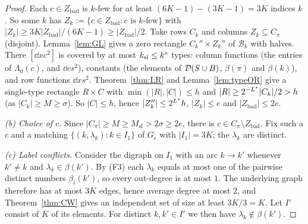\begin{proof}
Each $c\in Z_{\mathrm{bad}}$ is $k$-few for at least $(6K-1)-(3K-1)=3K$ indices $k$. So some $k$ has
$Z_k:=\{c\in Z_{\mathrm{bad}}:c\text{ is $k$-few}\}$ with $|Z_k|\ge3K|Z_{\mathrm{bad}}|/(6K-1)\ge|Z_{\mathrm{bad}}|/2$. Take rows $C_k$ and
columns $Z_k\subseteq C_\pi$ (disjoint). Lemma~\ref{lem:GL} gives a zero rectangle $C_k''\times Z_k''$ of $\mathcal B_k$ with halves.
There $[\dd xc^2]$ is covered by at most $k_{\mathrm{sl}}\le k^{\ast}$ types: column functions (the entries of $\Lambda_0(c)$, and
$\dd cs^2$), constants (the elements of $\mathcal{D}(S\cup B)$, $\beta(\pi)$ and $\beta(k)$), and row functions $\dd xs^2$.
Theorem~\ref{thm:LR} and Lemma~\ref{lem:typeOR} give a single-type rectangle $R\times C$ with $\min(|R|,|C|)\le h$ and
$|R|\ge2^{-L^{\ast}}|C_k|/2>h$ (as $|C_k|\ge M\ge\sigma$). So $|C|\le h$, hence $|Z_k''|\le2^{L^{\ast}}h$, $|Z_k|\le e$ and
$|Z_{\mathrm{bad}}|\le2e$.

\emph{(b) Choice of $c$.} Since $|C_\pi|\ge M\ge M_{\mathrm{sl}}>2\sigma\ge2e$, there is $c\in C_\pi\setminus Z_{\mathrm{bad}}$. Fix such a $c$
and a matching $\{(k,\lambda_k):k\in I_1\}$ of $G_c$ with $|I_1|=3K$; the $\lambda_k$ are distinct.

\emph{(c) Label conflicts.} Consider the digraph on $I_1$ with an arc $k\to k'$ whenever $k'\ne k$ and $\lambda_k\in\beta(k')$.
By (F3) each $\lambda_k$ equals at most one of the pairwise distinct numbers $\beta_i(k')$, so every out-degree is at most
$1$. The underlying graph therefore has at most $3K$ edges, hence average degree at most $2$, and
Theorem~\ref{thm:CW} gives an independent set of size at least $3K/3=K$. Let $I'$ consist of $K$ of its elements. For
distinct $k,k'\in I'$ we then have $\lambda_k\notin\beta(k')$.


\end{proof}

